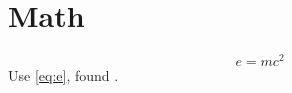 \documentclass{article}
\begin{document}
\section{Math}\label{sec:m}
\begin{equation}
e = mc^2 \label{eq:e}
\end{equation}
Use \eqref{eq:e}, found .
\end{document}
